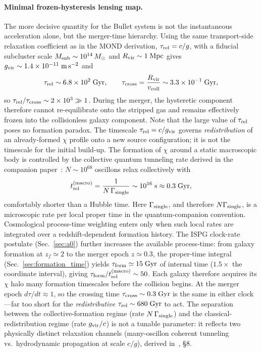\documentclass[11pt]{article}
\begin{document}
\paragraph{Minimal frozen-hysteresis lensing map.}
The more decisive quantity for the Bullet system is not the
instantaneous acceleration alone, but the merger-time
hierarchy.  Using the same transport-side relaxation
coefficient as in the MOND derivation,
$\tau_{\rm rel}=c/g$, with a fiducial subcluster scale
$M_{\rm sub}\sim10^{14}\,M_\odot$ and
$R_{\rm vir}\sim1\;\mathrm{Mpc}$ gives
$g_{\rm vir}\sim1.4\times10^{-11}\;\mathrm{m\,s^{-2}}$ and
\[
  \tau_{\rm rel}\sim6.8\times10^{2}\;\mathrm{Gyr},
  \qquad
  \tau_{\rm cross}=\frac{R_{\rm vir}}{v_{\rm coll}}
  \sim3.3\times10^{-1}\;\mathrm{Gyr},
\]
so $\tau_{\rm rel}/\tau_{\rm cross}\sim2\times10^{3}\gg1$.
During the merger, the hysteretic component therefore cannot
re-equilibrate onto the stripped gas and remains effectively
frozen into the collisionless galaxy component.
Note that the large value of $\tau_{\rm rel}$ poses no
formation paradox.
The timescale $\tau_{\rm rel}=c/g_{\rm vir}$ governs
\emph{redistribution} of an already-formed $\chi$ profile
onto a new source configuration; it is not the timescale
for the initial build-up.
The formation of $\chi$ around a static macroscopic body is
controlled by the collective quantum tunneling rate derived
in the companion paper~\cite{Lotishvili2026Q}:
$N\sim10^{68}$ oscillons relax collectively with
\begin{equation}
  t_{\rm rel}^{(\rm macro)}
  =\frac{1}{N\,\Gamma_{\rm single}}
  \sim 10^{16}\;\mathrm{s}
  \approx 0.3\;\mathrm{Gyr},
  \label{eq:t_macro_bullet}
\end{equation}
comfortably shorter than a Hubble time.
Here $\Gamma_{\rm single}$, and therefore $N\Gamma_{\rm single}$,
is a microscopic rate per local proper time in the quantum-companion
convention.  Cosmological process-time weighting enters only when
such local rates are integrated over a redshift-dependent formation
history.
The ISPG clock-rate postulate (Sec.~\ref{sec:a0}) further
increases the available process-time: from galaxy formation
at $z_f\simeq2$ to the merger epoch $z\simeq0.3$, the
proper-time integral (Sec.~\ref{sec:formation_time}) yields
$\tau_{\rm form}\simeq15\;\mathrm{Gyr}$ of internal time
($1.5\times$ the coordinate interval), giving
$\tau_{\rm form}/t_{\rm rel}^{(\rm macro)}\sim50$.
Each galaxy therefore acquires its $\chi$ halo many
formation timescales before the collision begins.
At the merger epoch $d\tau/dt\approx1$, so the crossing
time $\tau_{\rm cross}\sim0.3\;\mathrm{Gyr}$ is the same in
either clock---far too short for the \emph{redistributive}
$\tau_{\rm rel}\sim680\;\mathrm{Gyr}$ to act.
The separation between the collective-formation regime (rate
$N\,\Gamma_{\rm single}$) and the classical-redistribution
regime (rate $g_{\rm vir}/c$) is not a tunable parameter:
it reflects two physically distinct relaxation channels
(many-oscillon coherent tunneling vs.\ hydrodynamic
propagation at scale $c/g$), derived
in~\cite{Lotishvili2026Q}, §8.
\end{document}

